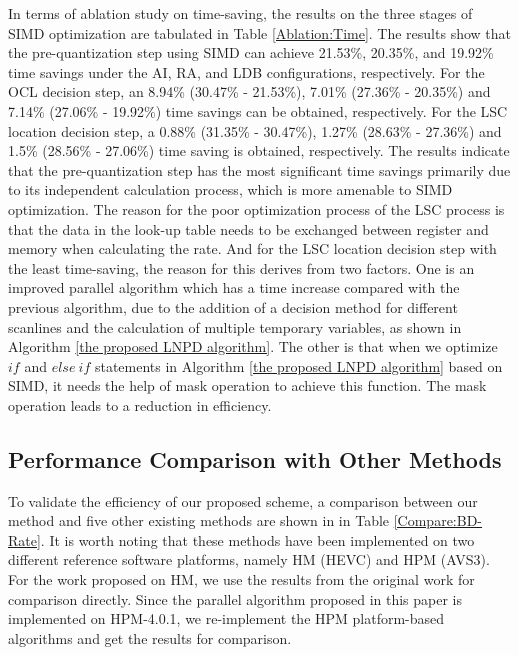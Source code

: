 \documentclass[lettersize,journal]{IEEEtran}
\begin{document}
In terms of ablation study on time-saving, the results on the three stages of SIMD optimization are tabulated in Table \ref{Ablation:Time}. The results show that the pre-quantization step using SIMD can achieve 21.53\%, 20.35\%, and 19.92\% time savings under the AI, RA, and LDB configurations, respectively. For the OCL decision step, an 8.94\% (30.47\% - 21.53\%), 7.01\% (27.36\% - 20.35\%) and 7.14\% (27.06\% - 19.92\%) time savings can be obtained, respectively. For the LSC location decision step, a 0.88\% (31.35\% - 30.47\%), 1.27\% (28.63\% - 27.36\%) and 1.5\% (28.56\% - 27.06\%) time saving is obtained, respectively. The results indicate that the pre-quantization step has the most significant time savings primarily due to its independent calculation process, which is more amenable to SIMD optimization. The reason for the poor optimization process of the LSC process is that the data in the look-up table needs to be exchanged between register and memory when calculating the rate. And for the LSC location decision step with the least time-saving, the reason for this derives from two factors. One is an improved parallel algorithm which has a time increase compared with the previous algorithm, due to the addition of a decision method for different scanlines and the calculation of multiple temporary variables, as shown in Algorithm \ref{the proposed LNPD algorithm}. The other is that when we optimize $if$ and $else\ if$ statements in Algorithm \ref{the proposed LNPD algorithm} based on SIMD, it needs the help of mask operation to achieve this function. The mask operation leads to a reduction in efficiency. 

\subsection{Performance Comparison with Other Methods} 
To validate the efficiency of our proposed scheme, a comparison between our method and five other existing methods are shown in in Table \ref{Compare:BD-Rate}. It is worth noting that these methods have been implemented on two different reference software platforms, namely HM (HEVC) and HPM (AVS3). For the work proposed on HM, we use the results from the original work for comparison directly. Since the parallel algorithm proposed in this paper is implemented on HPM-4.0.1, we re-implement the HPM platform-based algorithms and get the results for comparison. 
\end{document}
